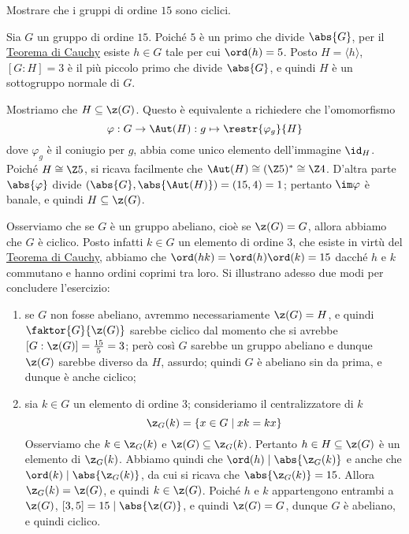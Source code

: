 \documentclass[11pt]{scrartcl}
\begin{document}
	\begin{exercise}
		Mostrare che i gruppi di ordine $15$ sono ciclici.
	\end{exercise}
	
	\begin{soln}
		Sia $G$ un gruppo di ordine $15$. Poiché $5$ è un primo che divide $\abs{G}$,
		per il \hyperref[teorema1.44]{Teorema di Cauchy} esiste $h \in G$ tale per cui $\ord(h) = 5$. Posto $H = \langle h\rangle$, $[G:H] = 3$ è il più piccolo primo che divide $\abs{G}$, e quindi $H$ è un sottogruppo 
		normale di $G$. \medskip
		
		
		Mostriamo che $H \subseteq \z(G)$. Questo è equivalente a 
		richiedere che l'omomorfismo \[
		\varphi: G \to \Aut(H) : g \mapsto \restr{\varphi_{g}}{H}
		\]
		dove $\varphi_g$ è il coniugio per $g$, abbia come unico elemento dell'immagine
		$\id_H$.
		Poiché $H \cong \Z5$, si ricava facilmente che $\Aut(H) \cong (\Z5)^* \cong \Z4$. D'altra 
		parte $\abs{\varphi}$ divide $(\abs{G}, \abs{\Aut(H)}) = (15, 4) = 1$; pertanto
		$\im \varphi$ è banale, e quindi $H \subseteq \z(G)$. \medskip
		
		
		Osserviamo che se $G$ è un gruppo abeliano, cioè se $\z(G) = G$,
		allora abbiamo che $G$ è ciclico. Posto infatti $k \in G$ un elemento di 
		ordine $3$, che esiste in virtù del \hyperref[teorema1.44]{Teorema di Cauchy},
		abbiamo che $\ord(hk) = \ord(h)\ord(k) = 15$ dacché $h$ e $k$ commutano e hanno
		ordini coprimi tra loro.
		Si illustrano adesso due modi per concludere l'esercizio:
		\begin{enumerate}[(1)]
			\item se $G$ non fosse abeliano, avremmo 
			necessariamente $\z(G) = H$, e quindi $\faktor{G}{\z(G)}$ sarebbe ciclico 
			dal momento che si avrebbe $[G : \z(G)] = \frac{15}{5} = 3$; però così $G$ sarebbe un gruppo abeliano e dunque $\z(G)$ sarebbe diverso da $H$, assurdo; quindi $G$
			è abeliano sin da prima, e dunque è anche ciclico;
			\item sia $k \in G$ un elemento di ordine 3; consideriamo il centralizzatore
			di $k$
			\[
			\z_G(k) = \{x \in G\mid xk = kx\}
			\]Osserviamo che $k \in \z_G(k)$ e $\z(G) \subseteq \z_G(k)$. Pertanto $h \in H \subseteq \z(G)$ è un elemento 
			di $\z_G(k)$. Abbiamo quindi che $\ord(h)\mid \abs{\z_G(k)}$ e anche che $\ord(k)\mid \abs{\z_G(k)}$, 
			da cui si ricava che $\abs{\z_G(k)} = 15$. Allora $\z_G(k) = \z(G)$, e quindi
			$k \in \z(G)$. Poiché $h$ e $k$ appartengono entrambi a $\z(G)$,
			$[3, 5] = 15 \mid \abs{\z(G)}$, e quindi $\z(G) = G$, dunque
			$G$ è abeliano, e quindi ciclico.
		\end{enumerate}
	\end{soln}
	
\end{document}
